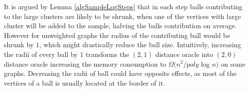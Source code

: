 \documentclass[shortabstract, lic, english]{iithesis}
\theoremstyle{definition} \newtheorem{definition}{Definition}[chapter]
\theoremstyle{remark} \newtheorem{remark}[definition]{Observation}
\theoremstyle{plain} \newtheorem{theorem}[definition]{Theorem}
\theoremstyle{plain} \newtheorem{lemma}[definition]{Lemma}
\theoremstyle{plain} \newtheorem{conjecture}[definition]{Conjecture}
\begin{document}
    It is argued by Lemma \ref{algSampleLogSteps} that in each step balls contributing to the large clusters are likely to be shrunk,
    when one of the vertices with large cluster will be added to the sample, halving the balls contribution on average.
    However for unweighted graphs the radius of the contributing ball would be shrunk by $1$, which might drastically reduce the ball size.
    Intuitively, increasing the radii of every ball by $1$ transforms the $(2,1)$ distance oracle into $(2,0)$ distance oracle
    increasing the memory consumption to $\Omega(n^2 / poly $ log $ n)$ on some graphs. Decreasing the radii of ball could have opposite effects,
    as most of the vertices of a ball is usually located at the border of it.





\end{document}
